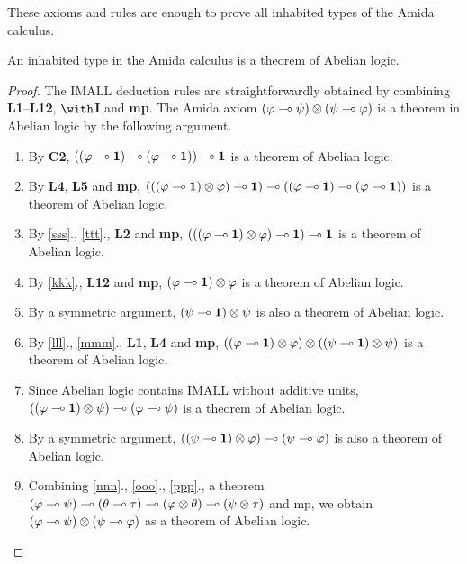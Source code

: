 These axioms and rules are enough to prove all inhabited types of
the Amida calculus.
\begin{theorem}
 \label{sound-to-abelian}
 An inhabited type in the Amida calculus is a theorem of Abelian logic.
\end{theorem}
\begin{proof}
 The IMALL deduction rules are straightforwardly obtained by combining
 \textbf{L1}--\textbf{L12}, $\with$\textbf{I} and \textbf{mp}.
 The Amida axiom $(\varphi\multimap\psi)\otimes (\psi\multimap\varphi)$ is a theorem
 in Abelian logic by the following argument.
 \begin{enumerate}
  \item \label{sss} By \textbf{C2},
	$((\varphi\multimap\mathbf{1})\multimap(\varphi\multimap\mathbf{1}))\multimap\mathbf{1}$ is a
	theorem of Abelian logic.
  \item \label{ttt} By \textbf{L4}, \textbf{L5} and \textbf{mp},
	$(((\varphi\multimap\mathbf{1})\otimes\varphi)\multimap\mathbf{1}) \multimap
	((\varphi\multimap\mathbf{1})\multimap(\varphi\multimap\mathbf{1}))$ is a theorem of Abelian
	logic.
  \item \label{kkk} By \ref{sss}., \ref{ttt}., \textbf{L2} and \textbf{mp},
	$ (((\varphi\multimap\mathbf{1})\otimes\varphi)\multimap\mathbf{1}) \multimap \mathbf{1} $ is a
	theorem of Abelian logic.
  \item \label{lll} By \ref{kkk}., \textbf{L12} and \textbf{mp},
	$(\varphi\multimap \mathbf{1})\otimes\varphi$ is a theorem of Abelian logic.
  \item \label{mmm} By a symmetric argument, $(\psi\multimap\mathbf{1})\otimes\psi$ is also a
	theorem of Abelian logic.
  \item \label{nnn} By \ref{lll}., \ref{mmm}., \textbf{L1}, \textbf{L4}
	and \textbf{mp}, $((\varphi\multimap
	\mathbf{1})\otimes\varphi)\otimes((\psi\multimap\mathbf{1})\otimes\psi)$ is a
	theorem of Abelian logic.
  \item \label{ooo} Since Abelian logic contains IMALL without additive units,
	$((\varphi\multimap\mathbf{1})\otimes\psi)\multimap(\varphi\multimap\psi)$ is a theorem
	of Abelian logic.
  \item \label{ppp} By a symmetric argument,
	$((\psi\multimap\mathbf{1})\otimes\varphi)\multimap(\psi\multimap\varphi)$ is also a
	theorem of Abelian logic.
  \item Combining \ref{nnn}., \ref{ooo}., \ref{ppp}., a theorem
	$(\varphi\multimap\psi)\multimap(\theta\multimap\tau)\multimap(\varphi\otimes\theta)\multimap(\psi\otimes\tau)$
	and
	mp, we obtain $(\varphi\multimap\psi)\otimes(\psi\multimap\varphi)$ as a
	theorem of Abelian
	logic.
 \end{enumerate}
\end{proof}

